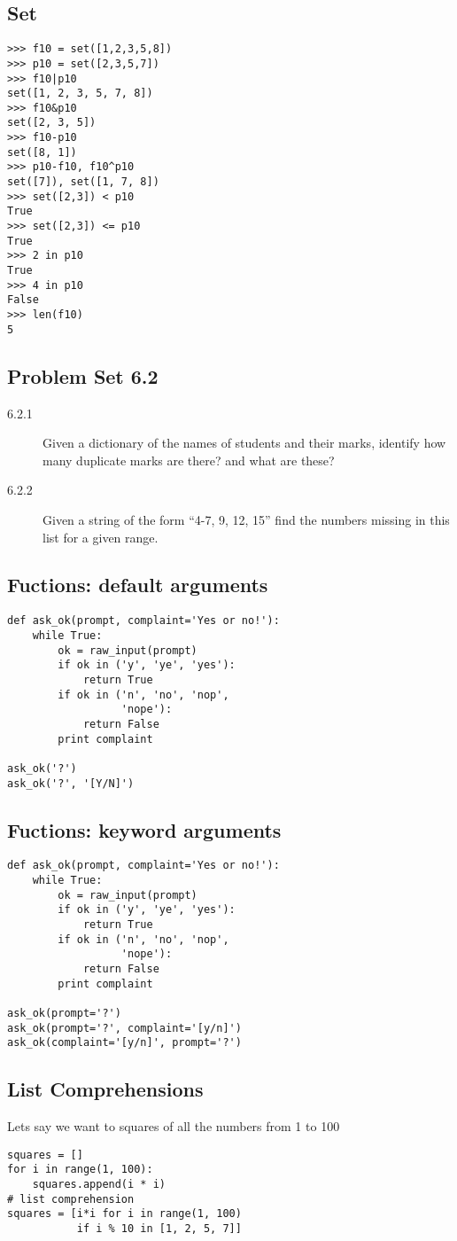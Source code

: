 \documentclass[12pt]{article}
\begin{document}
\subsection{Set}
\begin{verbatim}
>>> f10 = set([1,2,3,5,8])
>>> p10 = set([2,3,5,7])
>>> f10|p10
set([1, 2, 3, 5, 7, 8])
>>> f10&p10
set([2, 3, 5])
>>> f10-p10
set([8, 1])
>>> p10-f10, f10^p10
set([7]), set([1, 7, 8])
>>> set([2,3]) < p10
True
>>> set([2,3]) <= p10
True
>>> 2 in p10
True
>>> 4 in p10
False
>>> len(f10)
5
\end{verbatim}

\subsection{Problem Set 6.2}
\begin{description}
  \item[6.2.1] Given a dictionary of the names of students and their marks, identify how many duplicate marks are there? and what are these?
  \item[6.2.2] Given a string of the form ``4-7, 9, 12, 15'' find the numbers missing in this list for a given range.
\end{description}
\subsection{Fuctions: default arguments}
\begin{verbatim}
def ask_ok(prompt, complaint='Yes or no!'):
    while True:
        ok = raw_input(prompt)
        if ok in ('y', 'ye', 'yes'): 
            return True
        if ok in ('n', 'no', 'nop',
                  'nope'): 
            return False
        print complaint

ask_ok('?')
ask_ok('?', '[Y/N]')
\end{verbatim}
\newpage
\subsection{Fuctions: keyword arguments}
\begin{verbatim}
def ask_ok(prompt, complaint='Yes or no!'):
    while True:
        ok = raw_input(prompt)
        if ok in ('y', 'ye', 'yes'): 
            return True
        if ok in ('n', 'no', 'nop',
                  'nope'): 
            return False
        print complaint

ask_ok(prompt='?')
ask_ok(prompt='?', complaint='[y/n]')
ask_ok(complaint='[y/n]', prompt='?')
\end{verbatim}
\subsection{List Comprehensions}
Lets say we want to squares of all the numbers from 1 to 100
\begin{verbatim}
squares = []
for i in range(1, 100):
    squares.append(i * i)
# list comprehension
squares = [i*i for i in range(1, 100)
           if i % 10 in [1, 2, 5, 7]]
\end{verbatim}
\end{document}
